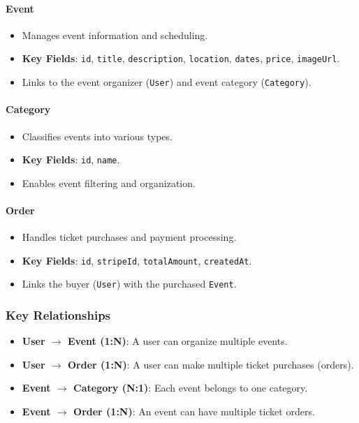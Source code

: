 \paragraph{Event}
\begin{itemize}
    \item Manages event information and scheduling.
    \item \textbf{Key Fields}: \texttt{id}, \texttt{title}, \texttt{description}, \texttt{location}, \texttt{dates}, \texttt{price}, \texttt{imageUrl}.
    \item Links to the event organizer (\texttt{User}) and event category (\texttt{Category}).
\end{itemize}

\paragraph{Category}
\begin{itemize}
    \item Classifies events into various types.
    \item \textbf{Key Fields}: \texttt{id}, \texttt{name}.
    \item Enables event filtering and organization.
\end{itemize}

\paragraph{Order}
\begin{itemize}
    \item Handles ticket purchases and payment processing.
    \item \textbf{Key Fields}: \texttt{id}, \texttt{stripeId}, \texttt{totalAmount}, \texttt{createdAt}.
    \item Links the buyer (\texttt{User}) with the purchased \texttt{Event}.
\end{itemize}

\subsubsection{Key Relationships}
\begin{itemize}
    \item \textbf{User $\rightarrow$ Event (1:N)}: A user can organize multiple events.
    \item \textbf{User $\rightarrow$ Order (1:N)}: A user can make multiple ticket purchases (orders).
    \item \textbf{Event $\rightarrow$ Category (N:1)}: Each event belongs to one category.
    \item \textbf{Event $\rightarrow$ Order (1:N)}: An event can have multiple ticket orders.
\end{itemize}

